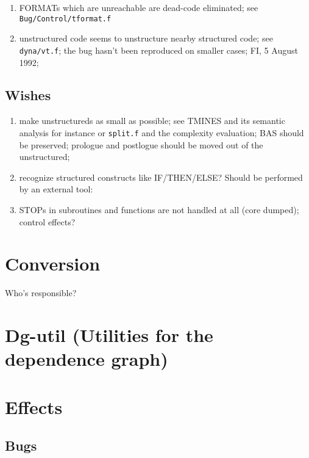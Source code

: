 \begin{enumerate}

  \item FORMATs which are unreachable are dead-code eliminated;
	see \verb+Bug/Control/tformat.f+

  \item unstructured code seems to unstructure nearby structured code;
	see \verb+dyna/vt.f+; the bug hasn't been reproduced
	on smaller cases; FI, 5 August 1992;

\end{enumerate}

\subsection{Wishes}

\begin{enumerate}

  \item {} make unstructureds as small as possible;
	see TMINES and its semantic analysis for instance or \verb+split.f+
	and the complexity evaluation; BAS should be preserved; prologue
	and postlogue should be moved out of the unstructured;

  \item recognize structured constructs like
	IF/THEN/ELSE? Should be performed by an external tool: 

  \item STOPs in subroutines and functions are not handled at 
	all (core dumped); control effects?

\end{enumerate}

\section{Conversion}

Who's responsible?

\section{Dg-util (Utilities for the dependence graph)}

\section{Effects}

\subsection{Bugs}

